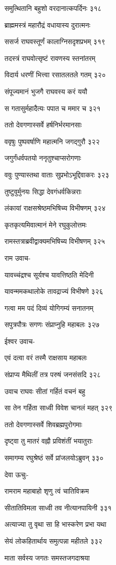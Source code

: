 समुत्थितानि बहुशो वरदानात्कपर्दिनः ३१८

ब्राह्ममस्त्रं महारौद्रं वधायास्य दुरात्मनः

ससर्ज राघवस्तूर्णं कालाग्निसदृशप्रभम् ३१९

तदस्त्रं राघवोत्सृष्टं रावणस्य स्तनांतरम्

विदार्य धरणीं भित्त्वा रसातलतले गतम् ३२०

संपूज्यमानं भुजगै राघवस्य करं ययौ

स गतासुर्महादैत्यः पपात च ममार च ३२१

ततो देवगणास्सर्वे हर्षनिर्भरमानसाः

ववृषुः पुष्पवर्षाणि महात्मनि जगद्गुरौ ३२२

जगुर्गंधर्वपतयो ननृतुश्चाप्सरोगणाः

ववुः पुण्यास्तथा वाताः सुप्रभोऽभूद्दिवाकरः ३२३

तुष्टुवुर्मुनयः सिद्धा देवगंधर्वकिन्नराः

लंकायां राक्षसश्रेष्ठमभिषिच्य विभीषणम् ३२४

कृतकृत्यमिवात्मानं मेने रघुकुलोत्तमः

रामस्तत्राब्रवीद्वाक्यमभिषिच्य विभीषणम् ३२५

राम उवाच-

यावच्चंद्रश्च सूर्यश्च यावत्तिष्ठति मेदिनी

यावन्ममकथालोके तावद्राज्यं विभीषणे ३२६

गत्वा मम पदं दिव्यं योगिगम्यं सनातनम्

सपुत्रपौत्रः सगणः संप्राप्नुहि महाबलः ३२७

ईश्वर उवाच-

एवं दत्वा वरं तस्मै राक्षसाय महाबलः

संप्राप्य मैथिलीं तत्र परुषं जनसंसदि ३२८

उवाच राघवः सीतां गर्हितं वचनं बहु

सा तेन गर्हिता साध्वी विवेश चानलं महत् ३२९

ततो देवगणास्सर्वे शिवब्रह्मपुरोगमाः

दृष्ट्वा तु मातरं वह्नौ प्रविशंतीं भयातुराः

समागम्य रघुश्रेष्ठं सर्वे प्रांजलयोऽब्रुवन् ३३०

देवा ऊचुः-

रामराम महाबाहो शृणु त्वं चातिविक्रम

सीतातिविमला साध्वी तव नीत्यानपायिनी ३३१

अत्याज्या तु वृथा सा हि भास्करेण प्रभा यथा

सेयं लोकहितार्थाय समुत्पन्ना महीतले ३३२

माता सर्वस्य जगतः समस्तजगदाश्रया

